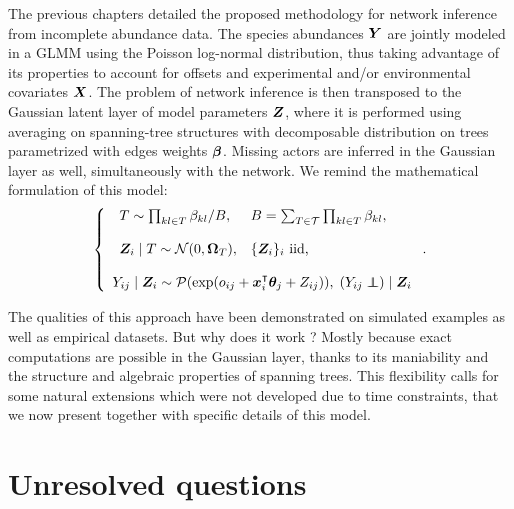 
 \vspace{0.5cm}
 
 The previous chapters detailed the proposed methodology for network inference from incomplete abundance data. The species abundances ${\boldsymbol{Y}}$ are jointly modeled in a GLMM using the Poisson log-normal distribution, thus taking advantage of its properties to account for offsets and experimental and/or environmental covariates ${\boldsymbol{X}}$. The problem of network inference is then transposed to the Gaussian latent layer of model parameters ${\boldsymbol{Z}}$, where it is performed using averaging on spanning-tree structures with decomposable distribution on trees parametrized with edges weights ${\boldsymbol{\beta}}$. Missing actors are inferred in the Gaussian layer as well, simultaneously with the network. We remind the mathematical formulation of this model:
  \begin{equation*}
 \left\{ \begin{array}{l}
 \begin{array}{ll}
 T\sim \prod_{kl\in T} \beta_{kl} / B, &B= \sum_{T\in\mathcal{T}} \prod_{kl \in T} \beta_{kl},\\\\
 \Zbf_i\mid T  \sim \Ncal (0, \Omegab_T), &\{\Zbf_i\}_i \text{ iid, }\\
 \end{array} \\\\
 Y_{ij}\mid \Zbf_i\sim \Pcal (\exp (o_{ij}+\xb_i^\intercal \thetab_j + Z_{ij})), \; (Y_{ij} \independent) \mid \Zbf_i 
 \end{array} \right. .
 \end{equation*}
 
 The qualities of this approach have been demonstrated on simulated examples as well as empirical datasets. But why does it work ? Mostly because exact computations are possible in the Gaussian layer, thanks to its maniability and the structure and algebraic properties of spanning trees.  This flexibility calls for some natural extensions which were not developed due to time constraints, that we now present together with specific details of this model.
 
 
\section{Unresolved questions}
